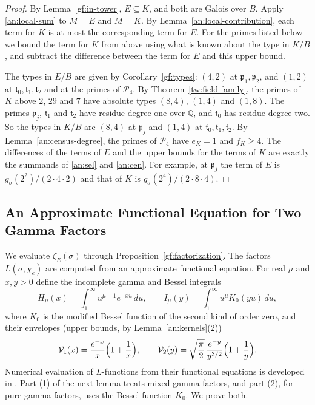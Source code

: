 \documentclass[11pt]{amsart}
\numberwithin{equation}{section}
\theoremstyle{definition}
\theoremstyle{remark}
\newcommand{\Q}{\mathbb Q}
\begin{document}
\begin{proof}
By Lemma~\ref{gf:in-tower}, $E\subseteq K$, and both are Galois over $B$.
Apply \eqref{an:local-sum} to $M=E$ and $M=K$. By
Lemma~\ref{an:local-contribution}, each term for $K$ is at most the
corresponding term for $E$. For the primes listed below we bound the term
for $K$ from above using what is known about the type in $K/B$, and
subtract the difference between the term for $E$ and this upper bound.

The types in $E/B$ are given by Corollary~\ref{gf:types}: $(4,2)$ at
$\mathfrak p_1,\mathfrak p_2$, and $(1,2)$ at $\mathfrak t_0,\mathfrak
t_1,\mathfrak t_2$ and at the primes of $\mathcal P_4$. By
Theorem~\ref{tw:field-family}, the primes of $K$ above $2$, $29$ and $7$ have
absolute types $(8,4)$, $(1,4)$ and $(1,8)$. The primes $\mathfrak p_j$,
$\mathfrak t_1$ and $\mathfrak t_2$ have residue degree one over $\Q$, and
$\mathfrak t_0$ has residue degree two. So the types in $K/B$ are $(8,4)$ at
$\mathfrak p_j$ and $(1,4)$ at $\mathfrak t_0,\mathfrak t_1,\mathfrak t_2$.
By Lemma~\ref{an:census-degree}, the primes of $\mathcal P_4$ have $e_K=1$
and $f_K\ge4$. The differences of the terms of $E$ and the upper bounds for
the terms of $K$ are exactly the summands of \eqref{an:sel} and
\eqref{an:cen}. For example, at $\mathfrak p_j$ the term of $E$ is
$g_\sigma(2^2)/(2\cdot4\cdot2)$ and that of $K$ is
$g_\sigma(2^4)/(2\cdot8\cdot4)$.
\end{proof}

\subsection{An Approximate Functional Equation for Two Gamma Factors}
\label{an:afe-section}
We evaluate $\zeta_E(\sigma)$ through Proposition~\ref{gf:factorization}. The
factors $L(\sigma,\chi_e)$ are computed from an approximate functional
equation. For real $\mu$ and $x,y>0$ define the incomplete gamma and Bessel
integrals
\[
 H_\mu(x)=\int_1^\infty u^{\mu-1}e^{-xu}\,du,\qquad
 I_\mu(y)=\int_1^\infty u^\mu K_0(yu)\,du,
\]
where $K_0$ is the modified Bessel function of the second kind of order
zero, and their envelopes (upper bounds, by Lemma~\ref{an:kernels}(2))
\[
 \mathcal V_1(x)=\frac{e^{-x}}x\Bigl(1+\frac1x\Bigr),\qquad
 \mathcal V_2(y)=\sqrt{\frac\pi2}\,\frac{e^{-y}}{y^{3/2}}\Bigl(1+\frac1y\Bigr).
\]
Numerical evaluation of $L$-functions from their functional equations is
developed in \cite{Dokchitser2004}. Part (1) of the next lemma treats mixed
gamma factors, and part (2), for pure gamma factors, uses the Bessel
function $K_0$. We prove both.
\end{document}
